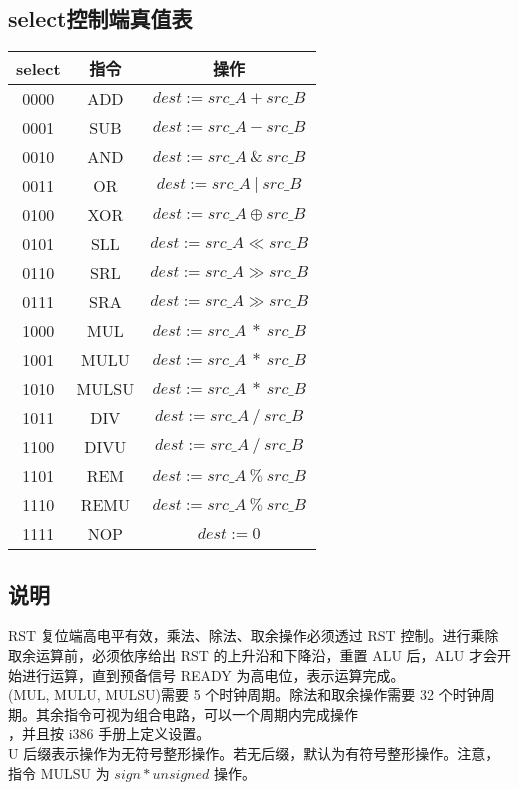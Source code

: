 \subsection{select控制端真值表}
\begin{tabular}{|c|c|c|}
    \hline
    select      &   指令   &      操作\\\hline
    0000        &   ADD     &    ${dest := src\_A + src\_B}$\\\hline
    0001        &   SUB     &    ${dest := src\_A - src\_B}$\\\hline
    0010        &   AND     &    ${dest := src\_A\ \&\ src\_B}$\\\hline
    0011        &   OR     &     ${dest := src\_A\ |\ src\_B}$\\\hline
    0100        &   XOR     &    ${dest := src\_A \oplus src\_B}$\\\hline
    0101        &   SLL     &    ${dest := src\_A \ll src\_B}$\\\hline
    0110        &   SRL     &    ${dest := src\_A \gg src\_B}$\\\hline
    0111        &   SRA     &    ${dest := src\_A \gg src\_B}$\\\hline
    1000        &   MUL     &    ${dest := src\_A\ *\ src\_B}$\\\hline
    1001        &   MULU    &    ${dest := src\_A\ *\ src\_B}$\\\hline
    1010        &   MULSU   &    ${dest := src\_A\ *\ src\_B}$\\\hline
    1011        &   DIV     &    ${dest := src\_A\ /\ src\_B}$\\\hline
    1100        &   DIVU     &   ${dest := src\_A\ /\ src\_B}$\\\hline
    1101        &   REM     &    ${dest := src\_A\ \%\ src\_B}$\\\hline
    1110        &   REMU     &   ${dest := src\_A\ \%\ src\_B}$\\\hline
    1111        &   NOP     &    ${dest := 0}$\\\hline
\end{tabular}
\subsection{说明}
RST 复位端高电平有效，乘法、除法、取余操作必须透过 RST 控制。进行乘除取余运算前，必须依序给出 RST 的上升沿和下降沿，重置 ALU 后，ALU 才会开始进行运算，直到预备信号 READY 为高电位，表示运算完成。\\
(MUL, MULU, MULSU)需要 5 个时钟周期。除法和取余操作需要 32 个时钟周期。其余指令可视为组合电路，可以一个周期内完成操作\\
，并且按 i386 手册上定义设置。\\
 U 后缀表示操作为无符号整形操作。若无后缀，默认为有符号整形操作。注意，指令 MULSU 为 ${sign * unsigned}$ 操作。

